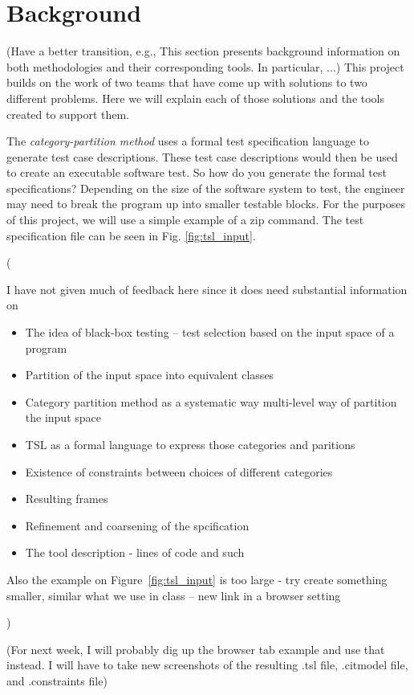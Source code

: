 \documentclass[a4full,12pt]{article}
\newcommand{\eas}[1]{{\color{blue}\sf ({#1})}}
\newcommand{\ag}[1]{{\color{red}\sf ({#1})}}
\begin{document}
  
\section{Background}
\eas{Have  a better transition, e.g., This section presents background information on both methodologies and their corresponding tools. In particular, ...}
This project builds on the work of two teams that have come up with solutions to
  two different problems. Here we will explain each of those solutions and the 
  tools created to support them.

The \emph{category-partition method} uses a formal test specification language to generate
  test case descriptions. These test case descriptions would then be used to
  create an executable software test. So how do you generate the formal test 
  specifications? Depending on the size of the software system to test, the 
  engineer may need to break the program up into smaller testable blocks. For 
  the purposes of this project, we will use a simple example of a zip command.
  The test specification file can be seen in Fig. \ref{fig:tsl_input}.\eas{I have not given much of feedback here since it does need substantial information on
  \begin{itemize}
  \item The idea of black-box testing -- test selection based on the input space of a program
  \item Partition of the input space into equivalent classes
  \item Category partition method as a systematic way multi-level way of partition the input space
  \item TSL as a formal language to express those categories and paritions
  \item Existence of constraints between choices of different categories
  \item Resulting frames
  \item Refinement and coarsening of the spcification
  \item The tool description - lines of code and such
  \end{itemize}
  Also the example on Figure~\ref{fig:tsl_input} is too large - try create something smaller, similar what we use in class -- new link in a browser setting
  }
  \ag{For next week, I will probably dig up the browser tab example and use that instead. I will have to take new screenshots of the resulting .tsl file, .citmodel file, and .constraints file}
\end{document}
